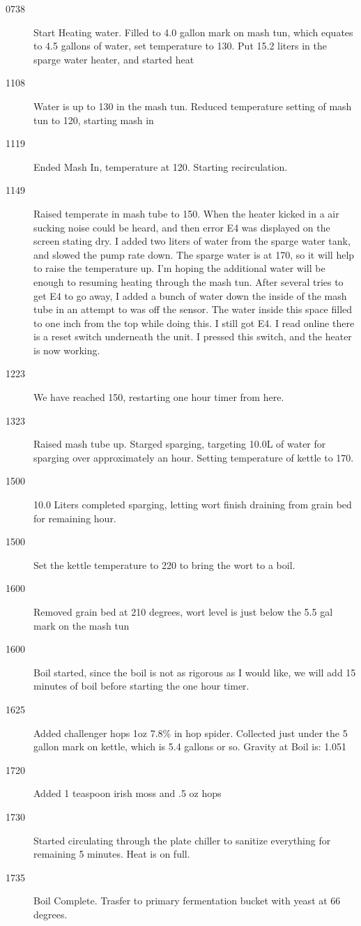 \FloatBarrier{}
\begin{description}
    \item[0738] Start Heating water.  Filled to 4.0 gallon mark on mash tun, which equates to 4.5 gallons of water, set temperature to 130.  Put 15.2 liters in the sparge water heater, and started heat
    \item[1108] Water is up to 130 in the mash tun. Reduced temperature setting of mash tun to 120, starting mash in
    \item[1119] Ended Mash In, temperature at 120.  Starting recirculation.
    \item[1149] Raised temperate in mash tube to 150.  When the heater kicked in a air sucking noise could be heard, and then error E4 was displayed on the screen stating dry.  I added two liters of water from the sparge water tank, and slowed the pump rate down.  The sparge water is at 170, so it will help to raise the temperature up.  I'm hoping the additional water will be enough to resuming heating through the mash tun.  After several tries to get E4 to go away, I added a bunch of water down the inside of the mash tube in an attempt to was off the sensor.  The water inside this space filled to one inch from the top while doing this.  I still got E4.  I read online there is a reset switch underneath the unit.  I pressed this switch, and the heater is now working.  
    \item[1223] We have reached 150, restarting one hour timer from here.
    \item[1323] Raised mash tube up. Starged sparging, targeting 10.0L of water for sparging over approximately an hour.  Setting temperature of kettle to 170.
    \item[1500] 10.0 Liters completed sparging, letting wort finish draining from grain bed for remaining hour.
    \item[1500] Set the kettle temperature to 220 to bring the wort to a boil.
    \item[1600] Removed grain bed at 210 degrees, wort level is just below the 5.5 gal mark on the mash tun
    \item[1600] Boil started, since the boil is not as rigorous as I would like, we will add 15 minutes of boil before starting the one hour timer.
    \item[1625] Added challenger hops 1oz 7.8\% in hop spider.  Collected just under the 5 gallon mark on kettle, which is 5.4 gallons or so.  Gravity at Boil is: 1.051
    \item[1720] Added 1 teaspoon irish moss and .5 oz hops
    \item[1730] Started circulating through the plate chiller to sanitize everything for remaining 5 minutes.  Heat is on full.
    \item[1735] Boil Complete.  Trasfer to primary fermentation bucket with yeast at 66 degrees.


\end{description}
